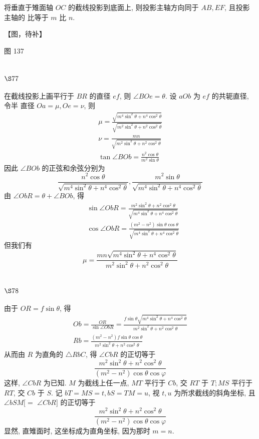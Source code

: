 将垂直于雉面轴 $O C$ 的截线投影到底面上, 则投影主轴方向同于 $A B, E F$, 且投影主轴的 比等于 $m$ 比 $n$.


【图，待补】

图 137

\section{$\S 77$}

在截线投影上画平行于 $B R$ 的直径 $e f$, 则 $\angle B O e=\theta$. 设 $a O b$ 为 $e f$ 的共轭直径, 令半 直径 $O a=\mu, O e=\nu$, 则
\[
\begin{gathered}
\mu=\frac{\sqrt{m^{4} \sin ^{2} \theta+n^{4} \cos ^{2} \theta}}{\sqrt{m^{2} \sin ^{2} \theta+n^{2} \cos ^{2} \theta}} \\
\nu=\frac{m n}{\sqrt{m^{2} \sin ^{2} \theta+n^{2} \cos ^{2} \theta}} \\
\tan \angle B O b=\frac{n^{2} \cos \theta}{m^{2} \sin \theta}
\end{gathered}
\]
因此 $\angle B O b$ 的正弦和余弦分别为
\[
\frac{n^{2} \cos \theta}{\sqrt{m^{4} \sin ^{2} \theta+n^{4} \cos ^{2} \theta}}, \frac{m^{2} \sin \theta}{\sqrt{m^{4} \sin ^{2} \theta+n^{4} \cos ^{2} \theta}}
\]
由 $\angle O b R=\theta+\angle B O b$, 得 
\[
\begin{aligned}
& \sin \angle O b R=\frac{m^{2} \sin ^{2} \theta+n^{2} \cos ^{2} \theta}{\sqrt{m^{4} \sin ^{2} \theta+n^{4} \cos ^{2} \theta}} \\
& \cos \angle O b R=\frac{\left(m^{2}-n^{2}\right) \sin \theta \cos \theta}{\sqrt{m^{4} \sin ^{2} \theta+n^{4} \cos ^{2} \theta}}
\end{aligned}
\]
但我们有
\[
\mu=\frac{m n \sqrt{m^{4} \sin ^{2} \theta+n^{4} \cos ^{2} \theta}}{m^{2} \sin ^{2} \theta+n^{2} \cos ^{2} \theta}
\]
\section{$\S 78$}

由于 $O R=f \sin \theta$, 得
\[
\begin{gathered}
O b=\frac{O R}{\sin \angle O b R}=\frac{f \sin \theta \sqrt{m^{4} \sin ^{2} \theta+n^{4} \cos ^{2} \theta}}{m^{2} \sin ^{2} \theta+n^{2} \cos ^{2} \theta} \\
R b=\frac{\left(m^{2}-n^{2}\right) f \sin \theta \cos \theta}{m^{2} \sin ^{2} \theta+n^{2} \cos ^{2} \theta}
\end{gathered}
\]
从而由 $R$ 为直角的 $\triangle R b C$, 得 $\angle C b R$ 的正切等于
\[
\frac{m^{2} \sin ^{2} \theta+n^{2} \cos ^{2} \theta}{\left(m^{2}-n^{2}\right) \cos \theta \cos \varphi}
\]
这样, $\angle C b R$ 为已知. $M$ 为截线上任一点, $M T$ 平行于 $C b$, 交 $R T$ 于 $T ; M S$ 平行于 $R T$, 交 $C b$ 于 $S$. 记 $b T=M S=t, b S=T M=u$, 视 $t, u$ 为所求截线的斜角坐标, 且 $\angle b S M[=$ $\angle C b R]$ 的正切等于
\[
\frac{m^{2} \sin ^{2} \theta+n^{2} \cos ^{2} \theta}{\left(m^{2}-n^{2}\right) \cos \theta \cos \varphi}
\]
显然, 直雉面时, 这坐标成为直角坐标, 因为那时 $m=n$.

